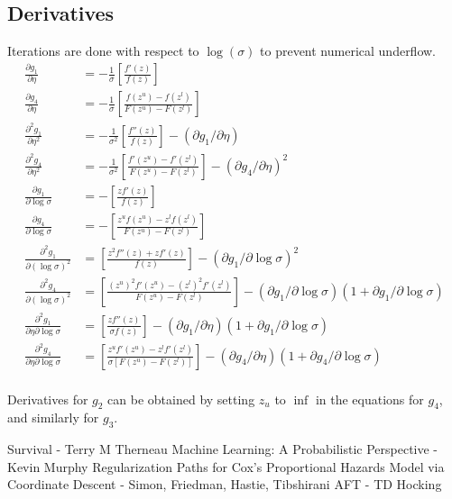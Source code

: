 \documentclass[12pt,a4paper]{report}
\begin{document}
\subsection*{Derivatives}
Iterations are done with respect to $\log(\sigma)$ to prevent numerical underflow.
\begin{equation}
\begin{split}
\frac{\partial g_1}{\partial \eta} & = - \frac{1}{\sigma} \left [ \frac{f'(z)}{f(z)} \right ] \\
\frac{\partial g_4}{\partial \eta} & = - \frac{1}{\sigma} \left [ \frac{f(z^u) - f(z^l)} {F(z^u) - F(z^l)} \right ] \\
\frac{\partial^2 g_1}{\partial \eta^2} & = - \frac{1}{\sigma^2} \left [ \frac{f''(z)}{f(z)} \right ] - \left ({\partial g_1}/{\partial \eta} \right ) \\
\frac{\partial^2 g_4}{\partial \eta^2} & = - \frac{1}{\sigma^2} \left [ \frac{f'(z^u) - f'(z^l)} {F(z^u) - F(z^l)} \right ] - \left ({\partial g_4}/{\partial \eta} \right )^2 \\
\frac{\partial g_1}{\partial \log \sigma} & = - \left [ \frac{z f'(z)}{f(z)} \right ] \\
\frac{\partial g_4}{\partial \log \sigma} & = - \left [ \frac{z^u f(z^u) - z^l f(z^l)} {F(z^u) - F(z^l)} \right ] \\
\frac{\partial^2 g_1}{\partial (\log \sigma )^2} & = \left [ \frac{z^2 f''(z) + z f'(z)}{f(z)} \right ] - \left ({\partial g_1}/{\partial \log \sigma } \right )^2 \\
\frac{\partial^2 g_4}{\partial (\log \sigma )^2} & = \left [ \frac{(z^u )^2 f'(z^u) - (z^l )^2 f'(z^l)} {F(z^u) - F(z^l)} \right ] - (\partial g_1 / \partial \log \sigma) (1 + \partial g_1 / \partial \log \sigma ) \\
\frac{\partial^2 g_1}{\partial \eta \partial \log \sigma} & = \left [\frac{z f''(z)} {\sigma f(z)} \right ] - (\partial g_1 / \partial \eta) (1 + \partial g_1 / \partial \log \sigma ) \\
\frac{\partial^2 g_4}{\partial \eta \partial \log \sigma} & = \left [\frac{z^u f'(z^u ) - z^l f'(z^l)} {\sigma [F(z^u) - F(z^l)]} \right ] - (\partial g_4 / \partial \eta) (1 + \partial g_4 / \partial \log \sigma ) \\
\end{split}  		%
\end{equation}

Derivatives for $g_2$ can be obtained by setting $z_u$ to $\inf$ in the equations for $g_4$, and similarly for $g_3$.


\begin{thebibliography}{1}
 Survival - Terry M Therneau
 Machine Learning: A Probabilistic Perspective - Kevin Murphy
 Regularization Paths for Cox's Proportional Hazards Model via Coordinate Descent - Simon, Friedman, Hastie, Tibshirani
 AFT - TD Hocking
\end{thebibliography}
\end{document}
